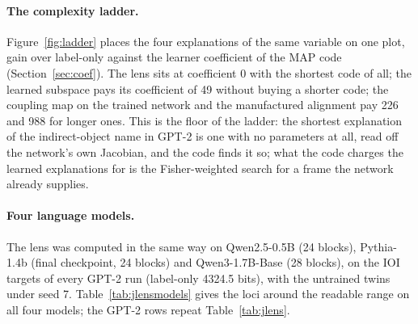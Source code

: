 \documentclass[11pt,a4paper]{article}
\begin{document}
\paragraph{The complexity ladder.} Figure~\ref{fig:ladder} places the four explanations of the same variable on one plot, gain over label-only against the learner coefficient of the MAP code (Section~\ref{sec:coef}). The lens sits at coefficient 0 with the shortest code of all; the learned subspace pays its coefficient of 49 without buying a shorter code; the coupling map on the trained network and the manufactured alignment pay 226 and 988 for longer ones. This is the floor of the ladder: the shortest explanation of the indirect-object name in GPT-2 is one with no parameters at all, read off the network's own Jacobian, and the code finds it so; what the code charges the learned explanations for is the Fisher-weighted search for a frame the network already supplies.

\paragraph{Four language models.} The lens was computed in the same way on Qwen2.5-0.5B (24 blocks), Pythia-1.4b (final checkpoint, 24 blocks) and Qwen3-1.7B-Base (28 blocks), on the IOI targets of every GPT-2 run (label-only 4324.5 bits), with the untrained twins under seed 7. Table~\ref{tab:jlensmodels} gives the loci around the readable range on all four models; the GPT-2 rows repeat Table~\ref{tab:jlens}.
\end{document}
